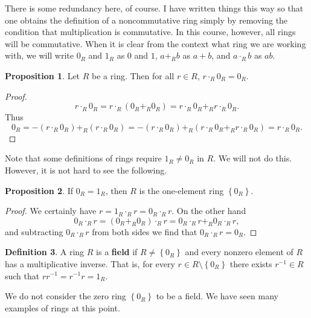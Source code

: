 \documentclass{article}
\newcommand{\rb}[1]{\left( #1 \right)}
\newcommand{\cb}[1]{\left\{ #1 \right\}}
\theoremstyle{definition}\newtheorem{definition}{Definition}[subsection]
\theoremstyle{definition}\newtheorem{remark}[definition]{Remark}
\theoremstyle{definition}\newtheorem*{example}{Example}
\theoremstyle{definition}\newtheorem*{note}{Note}
\newtheorem{proposition}[definition]{Proposition}
\begin{document}
There is some redundancy here, of course. I have written things this way so that one obtains the definition of a noncommutative ring simply by removing the condition that multiplication is commutative. In this course, however, all rings will be commutative. When it is clear from the context what ring we are working with, we will write $ 0_R $ and $ 1_R $ as $ 0 $ and $ 1 $, $ a +_R b $ as $ a + b $, and $ a \cdot_R b $ as $ ab $.

\begin{proposition}
Let $ R $ be a ring. Then for all $ r \in R $, $ r \cdot_R 0_R = 0_R $.
\end{proposition}

\begin{proof}
$$ r \cdot_R 0_R = r \cdot_R \rb{0_R +_R 0_R} = r \cdot_R 0_R +_R r \cdot_R 0_R. $$
Thus
$$ 0_R = -\rb{r \cdot_R 0_R} +_R \rb{r \cdot_R 0_R} = -\rb{r \cdot_R 0_R} +_R \rb{r \cdot_R 0_R +_R r \cdot_R 0_R} = r \cdot_R 0_R. $$
\end{proof}

Note that some definitions of rings require $ 1_R \ne 0_R $ in $ R $. We will not do this. However, it is not hard to see the following.

\begin{proposition}
If $ 0_R = 1_R $, then $ R $ is the one-element ring $ \cb{0_R} $.
\end{proposition}

\begin{proof}
We certainly have $ r = 1_R \cdot_R r = 0_R \cdot_R r $. On the other hand
$$ 0_R \cdot_R r = \rb{0_R +_R 0_R} \cdot_R r = 0_R \cdot_R r +_R 0_R \cdot_R r, $$
and subtracting $ 0_R \cdot_R r $ from both sides we find that $ 0_R \cdot_R r = 0_R $.
\end{proof}

\begin{definition}
A ring $ R $ is a \textbf{field} if $ R \ne \cb{0_R} $ and every nonzero element of $ R $ has a multiplicative inverse. That is, for every $ r \in R \setminus \cb{0_R} $ there exists $ r^{-1} \in R $ such that $ rr^{-1} = r^{-1}r = 1_R $.
\end{definition}

We do not consider the zero ring $ \cb{0_R} $ to be a field. We have seen many examples of rings at this point.
\end{document}
